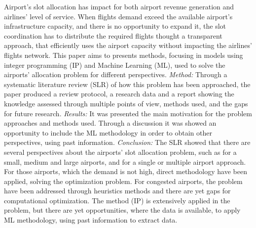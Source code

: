 Airport's slot allocation has impact for both airport revenue generation and airlines' level of service. When flights demand exceed the available airport's infrastructure capacity, and there is no opportunity to expand it, the slot coordination has to distribute the required flights thought a transparent approach, that efficiently uses the airport capacity without impacting the airlines' flights network. This paper aims to presents methods, focusing in models using integer programming (IP) and Machine Learning (ML), used to solve the airports' allocation problem for different perspectives.
\textit{Method:} Through a systematic literature review (SLR) of how this problem has been approached, the paper produced a review protocol, a research data and a report showing the knowledge assessed through multiple points of view, methods used, and the gaps for future research.
\textit{Results:} It was presented the main motivation for the problem approaches and methods used. Through a discussion it was showed an opportunity to include the ML methodology in order to obtain other perspectives, using past information.
\textit{Conclusion:} The SLR showed that there are several perspectives about the airports' slot allocation problem, such as for a small, medium and large airports, and for a single or multiple airport approach. For those airports, which the demand is not high, direct methodology have been applied, solving the optimization problem. For congested airports, the problem have been addressed through heuristics methods and there are yet gaps for computational optimization. The method (IP) is extensively applied in the problem, but there are yet opportunities, where the data is available, to apply ML methodology, using past information to extract data.